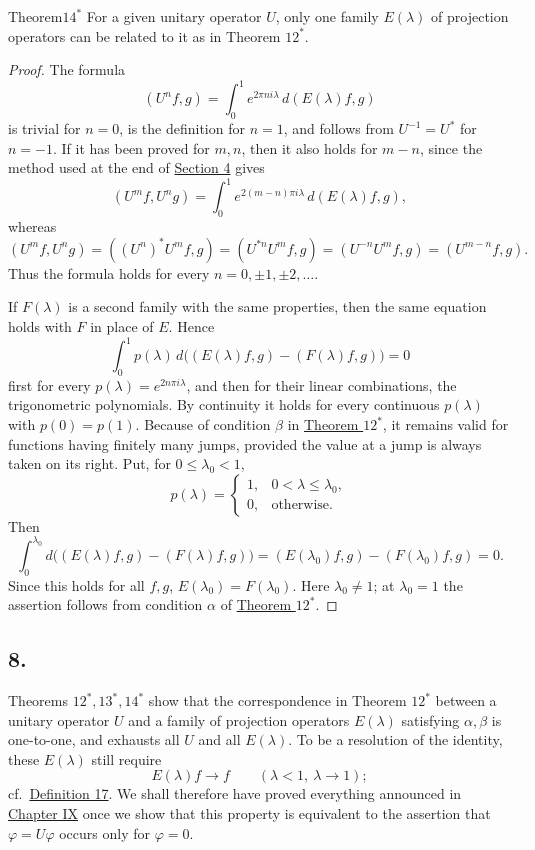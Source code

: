 ﻿\documentclass[paper=b5,fontsize=13pt,bookmarkpackage=false,twoside]{scrartcl}
\begin{document}
\begin{namedstatement}{Theorem}{\(14^*\)}
\label{thm:appII-14}
For a given unitary operator \(U\), only one family \(E(\lambda)\) of
projection operators can be related to it as in Theorem \(12^*\).
\end{namedstatement}

\begin{proof}
The formula
\[
  (U^nf,g)=\int_0^1e^{2\pi ni\lambda}\,
             d(E(\lambda)f,g)
\]
is trivial for \(n=0\), is the definition for \(n=1\), and follows from
\(U^{-1}=U^*\) for \(n=-1\).  If it has been proved for \(m,n\), then it
also holds for \(m-n\), since the method used at the end of
\hyperref[appII:4]{Section 4} gives
\[
  (U^mf,U^ng)
  =\int_0^1e^{2(m-n)\pi i\lambda}\,d(E(\lambda)f,g),
\]
whereas
\[
  (U^mf,U^ng)
  =((U^n)^*U^mf,g)
  =(U^{*n}U^mf,g)
  =(U^{-n}U^mf,g)
  =(U^{m-n}f,g).
\]
Thus the formula holds for every
\(n=0,\pm1,\pm2,\ldots\).

If \(F(\lambda)\) is a second family with the same properties, then the
same equation holds with \(F\) in place of \(E\).  Hence
\[
  \int_0^1p(\lambda)\,
    d\bigl((E(\lambda)f,g)-(F(\lambda)f,g)\bigr)=0
\]
first for every \(p(\lambda)=e^{2n\pi i\lambda}\), and then for their
linear combinations, the trigonometric polynomials.  By continuity it
holds for every continuous \(p(\lambda)\) with \(p(0)=p(1)\).  Because
of condition \(\beta\) in \hyperref[thm:appII-12]{Theorem \(12^*\)}, it remains valid for
functions having finitely many jumps, provided the value at a jump is
always taken on its right.  Put, for \(0\leq\lambda_0<1\),
\[
  p(\lambda)=
  \begin{cases}
    1,&0<\lambda\leq\lambda_0,\\
    0,&\text{otherwise}.
  \end{cases}
\]
Then
\[
 \int_0^{\lambda_0}
  d\bigl((E(\lambda)f,g)-(F(\lambda)f,g)\bigr)
 =(E(\lambda_0)f,g)-(F(\lambda_0)f,g)=0.
\]
Since this holds for all \(f,g\),
\(E(\lambda_0)=F(\lambda_0)\).  Here \(\lambda_0\neq1\); at
\(\lambda_0=1\) the assertion follows from condition \(\alpha\) of
\hyperref[thm:appII-12]{Theorem \(12^*\)}.
\end{proof}

\subsection*{8.}
\label{appII:8}

Theorems \(12^*,13^*,14^*\) show that the correspondence in
Theorem \(12^*\) between a unitary operator \(U\) and a family of
projection operators \(E(\lambda)\) satisfying \(\alpha,\beta\) is
one-to-one, and exhausts all \(U\) and all \(E(\lambda)\).  To be a
resolution of the identity, these \(E(\lambda)\) still require
\[
  E(\lambda)f\longrightarrow f
  \qquad(\lambda<1,\ \lambda\to1);
\]
cf.\ \hyperref[def:17]{Definition 17}.  We shall therefore have proved
everything announced in \hyperref[chap:IX]{Chapter IX} once we show
that this property is equivalent to the assertion that
\(\varphi=U\varphi\) occurs only for \(\varphi=0\).
\end{document}
